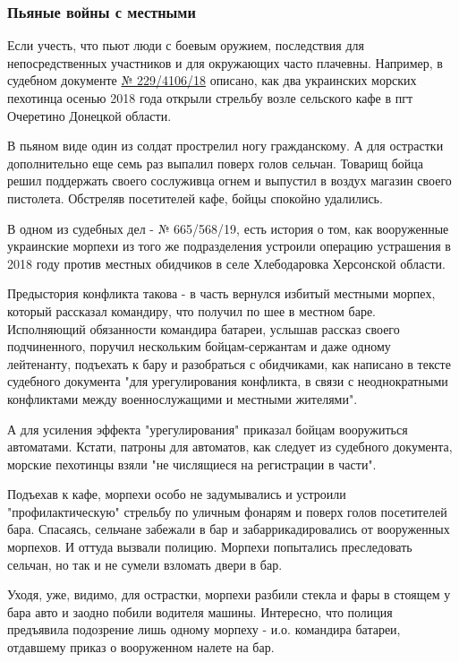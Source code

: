 \subsubsection{Пьяные войны с местными }

Если учесть, что пьют люди с боевым оружием, последствия для непосредственных
участников и для окружающих часто плачевны. Например, в судебном документе \href{https://reyestr.court.gov.ua/Review/76648400}{№
229/4106/18} описано, как два украинских морских пехотинца осенью 2018 года
открыли стрельбу возле сельского кафе в пгт Очеретино Донецкой области.

В пьяном виде один из солдат прострелил ногу гражданскому. А для острастки
дополнительно еще семь раз выпалил поверх голов сельчан. Товарищ бойца решил
поддержать своего сослуживца огнем и выпустил в воздух магазин своего
пистолета. Обстреляв посетителей кафе, бойцы спокойно удалились.

В одном из судебных дел - № 665/568/19, есть история о том, как вооруженные
украинские морпехи из того же подразделения устроили операцию устрашения в 2018
году против местных обидчиков в селе Хлебодаровка Херсонской области.

Предыстория конфликта такова - в часть вернулся избитый местными морпех,
который рассказал командиру, что получил по шее в местном баре. Исполняющий
обязанности командира батареи, услышав рассказ своего подчиненного, поручил
нескольким бойцам-сержантам и даже одному лейтенанту, подъехать к бару и
разобраться с обидчиками, как написано в тексте судебного документа "для
урегулирования конфликта, в связи с неоднократными конфликтами между
военнослужащими и местными жителями".

А для усиления эффекта "урегулирования" приказал бойцам вооружиться автоматами.
Кстати, патроны для автоматов, как следует из судебного документа, морские
пехотинцы взяли "не числящиеся на регистрации в части".

Подъехав к кафе, морпехи особо не задумывались и устроили "профилактическую"
стрельбу по уличным фонарям и поверх голов посетителей бара. Спасаясь, сельчане
забежали в бар и забаррикадировались от вооруженных морпехов. И оттуда вызвали
полицию. Морпехи попытались преследовать сельчан, но так и не сумели взломать
двери в бар.

Уходя, уже, видимо, для острастки, морпехи разбили стекла и фары в стоящем у
бара авто и заодно побили водителя машины. Интересно, что полиция предъявила
подозрение лишь одному морпеху - и.о. командира батареи, отдавшему приказ о
вооруженном налете на бар.

